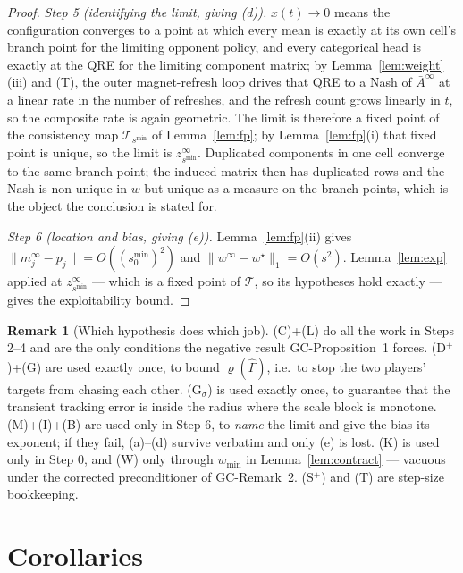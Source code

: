 \documentclass[11pt]{article}
\theoremstyle{definition}
\newtheorem{remark}{Remark}
\newcommand{\cT}{\mathcal{T}}
\newcommand{\GC}[1]{\textsf{GC-#1}}
\begin{document}
\begin{proof}
\emph{Step 5 (identifying the limit, giving (d)).} $x(t) \to 0$ means the
configuration converges to a point at which every mean is exactly at its own
cell's branch point for the limiting opponent policy, and every categorical head
is exactly at the QRE for the limiting component matrix; by
Lemma~\ref{lem:weight}(iii) and (T), the outer magnet-refresh loop drives that
QRE to a Nash of $\bar A^\infty$ at a linear rate in the number of refreshes, and
the refresh count grows linearly in $t$, so the composite rate is again
geometric. The limit is therefore a fixed point of the consistency map
$\cT_{s^{\min}}$ of Lemma~\ref{lem:fp}; by Lemma~\ref{lem:fp}(i) that fixed point
is unique, so the limit is $z^\infty_{s^{\min}}$. Duplicated components in one
cell converge to the same branch point; the induced matrix then has duplicated
rows and the Nash is non-unique in $w$ but unique as a measure on the branch
points, which is the object the conclusion is stated for.

\emph{Step 6 (location and bias, giving (e)).} Lemma~\ref{lem:fp}(ii) gives
$\|m^\infty_j - p_j\| = O((s^{\min}_0)^2)$ and $\|w^\infty - w^\star\|_1 =
O(s^2)$. Lemma~\ref{lem:exp} applied at $z^\infty_{s^{\min}}$ --- which is a fixed
point of $\cT$, so its hypotheses hold exactly --- gives the exploitability bound.
\end{proof}

\begin{remark}[Which hypothesis does which job]
(C)+(L) do all the work in Steps 2--4 and are the only conditions the negative
result \GC{Proposition~1} forces. (D$^+$)+(G) are used exactly once, to bound
$\varrho(\hat\Gamma)$, i.e.\ to stop the two players' targets from chasing each
other. (G$_\sigma$) is used exactly once, to guarantee that the transient
tracking error is inside the radius where the scale block is monotone. (M)+(I)+(B)
are used only in Step 6, to \emph{name} the limit and give the bias its exponent;
if they fail, (a)--(d) survive verbatim and only (e) is lost. (K) is used only in
Step 0, and (W) only through $w_{\min}$ in Lemma~\ref{lem:contract} --- vacuous
under the corrected preconditioner of \GC{Remark~2}. (S$^+$) and (T) are step-size
bookkeeping.
\end{remark}

\section{Corollaries}\label{sec:cor}
\end{document}
